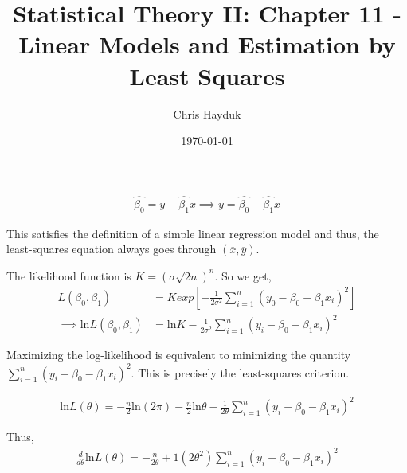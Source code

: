 \documentclass[12pt]{article}
\newenvironment{problem}[2][Problem]{\begin{trivlist}
\item[\hskip \labelsep {\bfseries #1}\hskip \labelsep {\bfseries #2.}]}{\end{trivlist}}
\begin{document}
\title{Statistical Theory II: Chapter 11 - Linear Models and Estimation by Least Squares}

\author{Chris Hayduk}
\date{\today}

\maketitle

\begin{problem}{11.1}
\end{problem}

\begin{align*}
	\hat{\beta_0} = \overline{y} - \hat{\beta_1}\overline{x} \implies \overline{y} = \hat{\beta_0} + \hat{\beta_1}\overline{x}
\end{align*}

This satisfies the definition of a simple linear regression model and thus, the least-squares equation always goes through $(\overline{x}, \overline{y})$.

\begin{problem}{11.20}
\end{problem}

The likelihood function is $K = (\sigma\sqrt{2n})^n$. So we get,
\begin{align*}
	L(\beta_0, \beta_1) &= K exp\left[-\frac{1}{2\sigma^2}\sum_{i=1}^{n} (y_0 - \beta_0 - \beta_1 x_i)^2\right]\\
	\implies \text{ln}L(\beta_0, \beta_1) &= \text{ln}K - \frac{1}{2\sigma^2}\sum_{i=1}^{n} (y_i - \beta_0 - \beta_1 x_i)^2
\end{align*}

Maximizing the log-likelihood is equivalent to minimizing the quantity $\sum_{i=1}^{n} (y_i - \beta_0 - \beta_1x_i)^2$. This is precisely the least-squares criterion.

\begin{problem}{11.22}
\end{problem}

\begin{align*}
	\text{ln}L(\theta) = -\frac{n}{2}\text{ln}(2\pi) - \frac{n}{2}\text{ln}\theta - \frac{1}{2\theta} \sum_{i=1}^{n}(y_i - \beta_0 - \beta_1x_i)^2
\end{align*}

Thus,
\begin{align*}
	\frac{d}{d\theta}\text{ln}L(\theta) = -\frac{n}{2\theta} + \text{1}(2\theta^2)\sum_{i=1}^{n}(y_i - \beta_0 - \beta_1x_i)^2
\end{align*}
\end{document}

